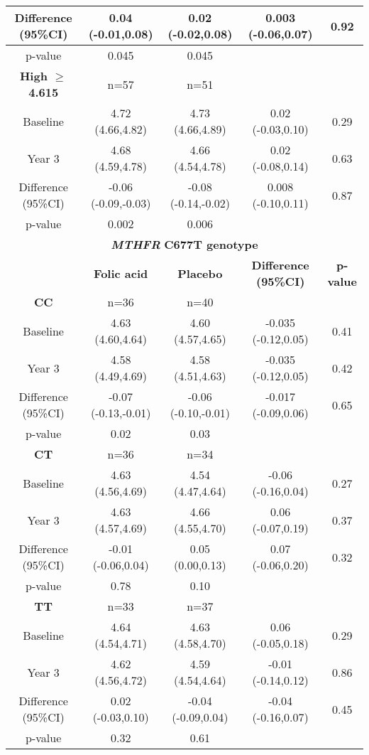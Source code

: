 \begin{longtable}{ccccc}
\hline
 Difference (95\%CI) & 0.04 (-0.01,0.08) & 0.02 (-0.02,0.08) & 0.003 (-0.06,0.07) & 0.92\\
\hline
 p-value & 0.045 & 0.045 & ~ & ~ \\
\hline
\bfseries High ${\geq}$ 4.615 & n=57 & n=51 & ~ & ~ \\
\hline
 Baseline & 4.72 (4.66,4.82) & 4.73 (4.66,4.89) & 0.02 (-0.03,0.10) & 0.29\\
\hline
 Year 3 & 4.68 (4.59,4.78) & 4.66 (4.54,4.78) & 0.02 (-0.08,0.14) & 0.63\\
\hline
 Difference (95\%CI) & {}-0.06 (-0.09,-0.03) & {}-0.08 (-0.14,-0.02) & 0.008 (-0.10,0.11) & 0.87\\
\hline
 p-value & 0.002 & 0.006 & ~ & ~ \\
\hline
\multicolumn{5}{c}{\textbf{\textit{MTHFR}}\textbf{ C677T genotype}}\\
\hline ~ & \bfseries Folic acid & \bfseries Placebo & \bfseries Difference (95\%CI) & \bfseries p-value\\
\hline
\bfseries CC & n=36 & n=40 & ~ & ~ \\
\hline
 Baseline & 4.63 (4.60,4.64) & 4.60 (4.57,4.65) & {}-0.035 (-0.12,0.05) & 0.41\\
\hline
 Year 3 & 4.58 (4.49,4.69) & 4.58 (4.51,4.63) & {}-0.035 (-0.12,0.05) & 0.42\\
\hline
 Difference (95\%CI) & {}-0.07 (-0.13,-0.01) & {}-0.06 (-0.10,-0.01) & {}-0.017 (-0.09,0.06) & 0.65\\
\hline
 p-value & 0.02 & 0.03 & ~ & ~ \\
\hline
\bfseries CT & n=36 & n=34 & ~ & ~ \\
\hline
 Baseline & 4.63 (4.56,4.69) & 4.54 (4.47,4.64) & {}-0.06 (-0.16,0.04) & 0.27\\
\hline
 Year 3 & 4.63 (4.57,4.69) & 4.66 (4.55,4.70) & 0.06 (-0.07,0.19) & 0.37\\
\hline
 Difference (95\%CI) & {}-0.01 (-0.06,0.04) & 0.05 (0.00,0.13) & 0.07 (-0.06,0.20) & 0.32\\
\hline
 p-value & 0.78 & 0.10 & ~ & ~ \\
\hline
\bfseries TT & n=33 & n=37 & ~ & ~ \\
\hline
 Baseline & 4.64 (4.54,4.71) & 4.63 (4.58,4.70) & 0.06 (-0.05,0.18) & 0.29\\
\hline
 Year 3 & 4.62 (4.56,4.72) & 4.59 (4.54,4.64) & {}-0.01 (-0.14,0.12) & 0.86\\
\hline
 Difference (95\%CI) & 0.02 (-0.03,0.10) & {}-0.04 (-0.09,0.04) & {}-0.04 (-0.16,0.07) & 0.45\\
\hline
 p-value & 0.32 & 0.61 & ~ & ~ \\
\hline
\end{longtable}



